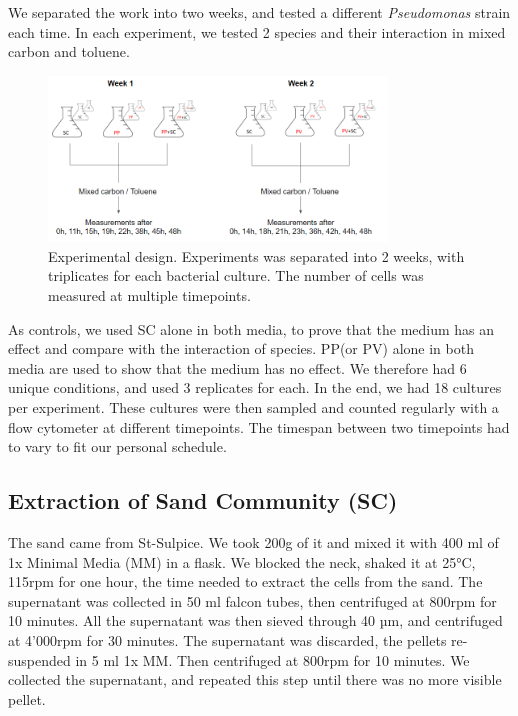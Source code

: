 \documentclass[a4paper, 10pt, conference]{ieeeconf}   %
\begin{document}
We separated the work into two weeks, and tested a different \textit{Pseudomonas} strain each time. In each experiment, we tested 2 species and their interaction in mixed carbon and toluene.

\begin{figure}[H]

	  
		\includegraphics[width=9cm]{erlenmeyer.PNG}
	\caption{Experimental design. Experiments was separated into 2 weeks, with triplicates for each bacterial culture. The number of cells was measured at multiple timepoints.}
	\label{design_weeks}


\end{figure}

As controls, we used SC alone in both media, to prove that the medium has an effect and compare with the interaction of species. PP(or PV) alone in both media are used to show that the medium has no effect.
We therefore had 6 unique conditions, and used 3 replicates for each. In the end, we had 18 cultures per experiment. These cultures were then sampled and counted regularly with a flow cytometer at different timepoints. The timespan between two timepoints had to vary to fit our personal schedule.


\subsection{Extraction of Sand Community (SC)}
The sand came from St-Sulpice. We took 200g of it and mixed it with 400 ml of 1x Minimal Media (MM) in a flask. We blocked the neck, shaked it at 25°C, 115rpm for one hour, the time needed to extract the cells from the sand. The supernatant was collected in 50 ml falcon tubes, then centrifuged at 800rpm for 10 minutes. All the supernatant was then sieved through 40 µm, and centrifuged at 4’000rpm for 30 minutes. The supernatant was discarded, the pellets re-suspended in 5 ml 1x MM. Then centrifuged at 800rpm for 10 minutes. We collected the supernatant, and repeated this step until there was no more visible pellet.
\end{document}
